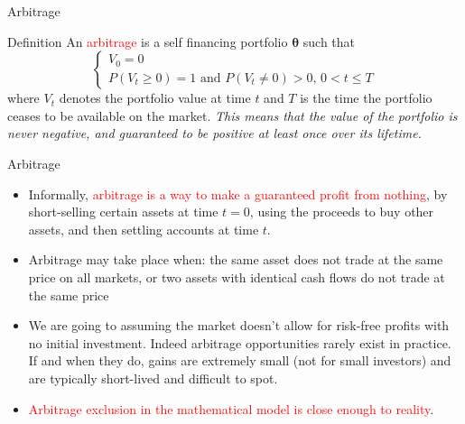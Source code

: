 \documentclass{beamer}
\begin{document}
\begin{frame}{Arbitrage}
	\begin{block}{Definition}
		An \textcolor{red}{arbitrage} is a self financing portfolio $\mathbf{\theta}$ such that
		\begin{equation}
			\begin{cases}
			V_0 = 0 \\
			P(V_{t}\geq 0)=1\text{ and }P(V_{t}\neq 0)>0,\,0<t\leq T
			\end{cases}
		\end{equation}
		where $V_t$ denotes the portfolio value at time $t$ and $T$ is the time the portfolio ceases to be available on the market. 
		\emph{This means that the value of the portfolio is never negative, and guaranteed to be positive at least once over its lifetime.}
	\end{block}
\end{frame}
\begin{frame}{Arbitrage}
	\begin{itemize}
		\item 	Informally, \textcolor{red}{arbitrage is a way to make a guaranteed profit from nothing}, by short-selling certain assets at time $t = 0$, using the proceeds to buy other assets, and then settling accounts at time $t$. 
		\item Arbitrage may take place when: the same asset does not trade at the same price on all markets, or two assets with identical cash flows do not trade at the same price
		\item We are going to assuming the market doesn't allow for risk-free profits with no initial investment.
		Indeed arbitrage opportunities rarely exist in practice. If and when they do, gains are extremely small (not for small investors) and are typically short-lived and difficult to spot. 
		\item \textcolor{red}{Arbitrage exclusion in the mathematical model is close enough to reality}.
	\end{itemize}
\end{frame}
\end{document}
